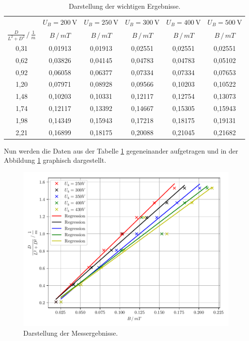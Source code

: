 \begin{table}[H]
  \centering
  \caption{Darstellung der wichtigen Ergebnisse.}
  \label{tab:5}
  \begin{tabular}{c c c c c c}
\toprule
& \multicolumn{1}{c}{$U_B=\SI{200}{\volt}$} & \multicolumn{1}{c}{$U_B=\SI{250}{\volt}$} &\multicolumn{1}{c}{$U_B=\SI{300}{\volt}$}&\multicolumn{1}{c}{$U_B=\SI{400}{\volt}$}&\multicolumn{1}{c}{$U_B=\SI{500}{\volt}$}\\
\cmidrule(lr){2-2}\cmidrule(lr){3-3}\cmidrule(lr){4-4}\cmidrule(lr){5-5}\cmidrule(lr){6-6}
$\frac{D}{L^2+D^2} \, /\, \frac{1}{m}$ & $B \,/\, mT$ & $B \,/\, mT$ &$B \,/\, mT$ &$B \,/\, mT$ &$B \,/\, mT$\\
\midrule
0,31 & 0,01913 & 0,01913 & 0,02551 & 0,02551 & 0,02551\\
0,62 & 0,03826 & 0,04145 & 0,04783 & 0,04783 & 0,05102\\
0,92 & 0,06058 & 0,06377 & 0,07334 & 0,07334 & 0,07653\\
1,20 & 0,07971 & 0,08928 & 0,09566 & 0,10203 & 0,10522\\
1,48 & 0,10203 & 0,10331 & 0,12117 & 0,12754 & 0,13073\\
1,74 & 0,12117 & 0,13392 & 0,14667 & 0,15305 & 0,15943\\
1,98 & 0,14349 & 0,15943 & 0,17218 & 0,18175 & 0,19131\\
2,21 & 0,16899 & 0,18175 & 0,20088 & 0,21045 & 0,21682\\
\bottomrule
  \end{tabular}
\end{table}
Nun werden die Daten aus der Tabelle \ref{tab:5} gegeneinander aufgetragen und
in der Abbildung \ref{abb:8} graphisch dargestellt.
\begin{figure}[H]
  \centering
  \includegraphics[width=\textwidth]{plot3.pdf}
  \caption{Darstellung der Messergebnisse.}
  \label{abb:8}
\end{figure}
